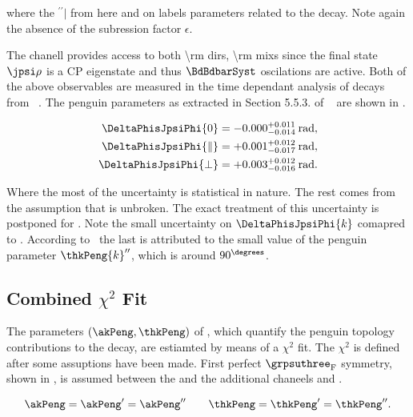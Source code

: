\noindent where the ${}^{\prime\prime}|$ from here and on labels parameters related to the \BdJpsiRho decay.
Note again the absence of the subression factor $\epsilon$.

The \BdJpsiRho chanell provides access to both \Acp{\rm dir}, \Acp{\rm mix} since the final state $\jpsi\rho$ is
a CP eigenstate and thus $\BdBdbarSyst$ oscilations are active. Both of the above observables are measured in the
time dependant analysis of \BdJpsipipi decays from \lhcb~\cite{Aaij:2014vda}. The penguin parameters as extracted
in Section 5.5.3. of ~\cite{DeBruyn-thesis} are shown in .

\begin{subequations}
  \label{delta_phis_jpsirho}
  \begin{align}
    \DeltaPhisJpsiPhi{0}         & = -0.000^{+0.011}_{-0.014}\:\text{rad},\\
    \DeltaPhisJpsiPhi{\parallel} & = +0.001^{+0.012}_{-0.017}\:\text{rad},\\
    \DeltaPhisJpsiPhi{\perp}     & = +0.003^{+0.012}_{-0.016}\:\text{rad}.
  \end{align}
\end{subequations}

\noindent Where the most of the uncertainty is statistical in nature. The rest comes from the assumption that \grpsuthree is
unbroken. The exact treatment of this uncertainty is postponed for . Note the small uncertainty on
$\DeltaPhisJpsiPhi{k}$ comapred to . According to~\cite{DeBruyn-thesis} the last is attributed
to the small value of the penguin parameter $\thkPeng{k}''$, which is around $90^{\degrees}$.

\subsection{Combined $\chi^2$ Fit}
\label{penguin_chi2_fit}

The parameters $(\akPeng,\thkPeng)$ of , which quantify the penguin topology contributions
to the \BsJpsiPhi decay, are estiamted by means of a $\chi^2$ fit. The $\chi^2$ is defined after some assuptions have been made.
First perfect $\grpsuthree_{\rm F}$ symmetry, shown in , is assumed between the \BsJpsiPhi and the
additional chaneels \BsJpsiKst and \BdJpsiRho.

\begin{equation}
\akPeng= \akPeng' = \akPeng'' \qquad \thkPeng = \thkPeng' = \thkPeng''.
\label{su3_apply}
\end{equation}

